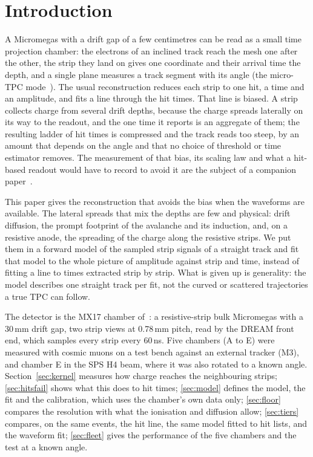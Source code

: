 \section{Introduction}\label{sec:intro}
A Micromegas with a drift gap of a few centimetres can be read as a small time projection chamber: the electrons
of an inclined track reach the mesh one after the other, the strip they land on gives one coordinate and their
arrival time the depth, and a single plane measures a track segment with its angle (the micro-TPC
mode~\cite{paperI}). The usual reconstruction reduces each strip to one hit, a time and an amplitude, and fits a
line through the hit times. That line is biased. A strip collects charge from several drift depths, because the
charge spreads laterally on its way to the readout, and the one time it reports is an aggregate of them; the
resulting ladder of hit times is compressed and the track reads too steep, by an amount that depends on the angle and
that no choice of threshold or time estimator removes. The measurement of that bias, its scaling law and what a
hit-based readout would have to record to avoid it are the subject of a companion paper~\cite{paperIIb}.

This paper gives the reconstruction that avoids the bias when the waveforms are available. The lateral spreads that
mix the depths are few and physical: drift diffusion, the prompt footprint of the avalanche and its induction, and,
on a resistive anode, the spreading of the charge along the resistive strips. We put them in a forward model of the
sampled strip signals of a straight track and fit that model to the whole picture of amplitude against strip and
time, instead of fitting a line to times extracted strip by strip. What is given up is generality: the model
describes one straight track per fit, not the curved or scattered trajectories a true TPC can follow.

The detector is the MX17 chamber of~\cite{paperI}: a resistive-strip bulk Micromegas with a 30\,mm drift gap, two
strip views at 0.78\,mm pitch, read by the DREAM front end, which samples every strip every 60\,ns. Five chambers
(A to E) were measured with cosmic muons on a test bench against an external tracker (M3), and chamber E in the SPS H4
beam, where it was also rotated to a known angle. Section~\ref{sec:kernel} measures how charge reaches the
neighbouring strips; \cref{sec:hitsfail} shows what this does to hit times; \cref{sec:model} defines the model, the fit
and the calibration, which uses the chamber's own data only; \cref{sec:floor} compares the resolution with what the
ionisation and diffusion allow; \cref{sec:tiers} compares, on the same events, the hit line, the same model fitted
to hit lists, and the waveform fit; \cref{sec:fleet} gives the performance of the five chambers and the test at a
known angle.
